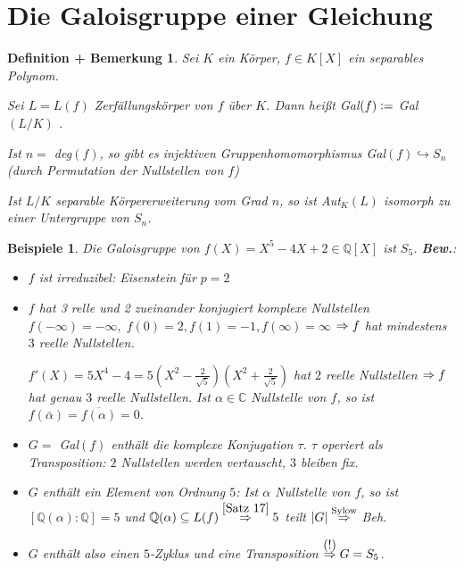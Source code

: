 \documentclass[a4paper,10pt,german]{scrbook}
\theoremstyle{saetze}
\theoremstyle{definitionen}
\newtheorem{DefBem}[Def]{Definition + Bemerkung}
\newtheorem{Bsp}[Def]{Beispiele}
\begin{document}
\section{Die Galoisgruppe einer Gleichung}

\begin{DefBem}
Sei $K$ ein Körper, $f \in K[X]$ ein separables Polynom.

\begin{enum}
\item Sei $L= L(f)$ Zerfällungskörper von $f$ über $K$. Dann heißt
Gal$(f) \mathrel{\mathop:}=$ Gal$(L/K)$ .

\item Ist $n =$ deg$(f)$, so gibt es injektiven
Gruppenhomomorphismus Gal$(f) \hookrightarrow S_n$ (durch
Permutation der Nullstellen von $f$)

\item Ist $L/K$ separable Körpererweiterung vom Grad $n$, so ist
Aut$_K(L)$ isomorph zu einer Untergruppe von $S_n$.

\end{enum}
\end{DefBem}

\begin{Bsp}
Die Galoisgruppe von $f(X) = X^5 - 4X + 2 \in
\mathbb{Q}[X]$ ist $S_5$.
\newline\newline\textbf{Bew.}:\begin{itemize}

\item $f$ ist irreduzibel: Eisenstein für $p=2$

\item $f$ hat 3 relle und 2 zueinander konjugiert komplexe
Nullstellen $f(-\infty) = -\infty,\;f(0)=2,f(1) =
-1,f(\infty)=\infty$ $\Rightarrow f$ hat mindestens $3$ reelle Nullstellen.

$f'(X) = 5X^4 - 4 = 5(X^2 - \frac{2}{\sqrt{5}})(X^2 +
\frac{2}{\sqrt{5}})$ hat $2$ reelle Nullstellen $\Rightarrow f$ hat genau
$3$ reelle Nullstellen. Ist $\alpha \in \mathbb{C}$ Nullstelle von
$f$, so ist $f(\bar \alpha) = \overline{f(\alpha)} = 0$.

\item $G=$ Gal$(f)$ enthält die komplexe Konjugation $\tau$. $\tau$
operiert als Transposition: $2$ Nullstellen werden vertauscht, $3$
bleiben fix.

\item $G$ enthält ein Element von Ordnung $5$: Ist $\alpha$
Nullstelle von $f$, so ist $[\mathbb{Q}(\alpha):\mathbb{Q}] = 5$ und
$\mathbb{Q}(\alpha) \subseteq L(f) \overset{\ref{Satz 17}}{\Rightarrow} 5$
teilt $|G| \overset{\mbox{\scriptsize Sylow}}{\Rightarrow}$ Beh.

\item $G$ enthält also einen $5$-Zyklus und eine Transposition
$\overset{\mbox{(!)}}{\Rightarrow} G = S_5$.
\end{itemize}
\end{Bsp}
\end{document}
